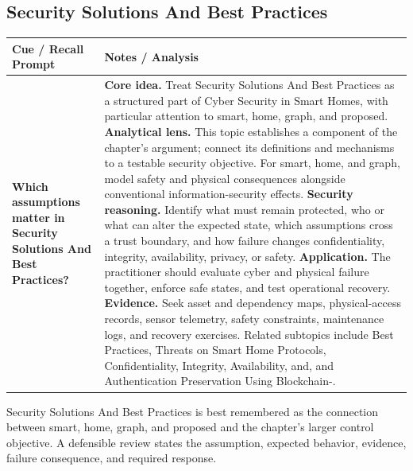\documentclass[11pt]{article}
\newcommand{\CornellHeader}{%
\rowcolor{Navy}\color{white}\bfseries Cue / Recall Prompt & \color{white}\bfseries Notes / Analysis\\\hline}
\newcommand{\CornellRow}[2]{%
\cellcolor{CueGray}\RaggedRight\textbf{#1} & \RaggedRight #2\\\hline}
\begin{document}
\subsection*{Security Solutions And Best Practices}
\begin{longtable}{>{\RaggedRight\arraybackslash}p{}|>{\RaggedRight\arraybackslash}p{}}
\CornellHeader
\CornellRow{Which assumptions matter in Security Solutions And Best Practices?}{\textbf{Core idea.} Treat Security Solutions And Best Practices as a structured part of Cyber Security in Smart Homes, with particular attention to smart, home, graph, and proposed. \textbf{Analytical lens.} This topic establishes a component of the chapter's argument; connect its definitions and mechanisms to a testable security objective. For smart, home, and graph, model safety and physical consequences alongside conventional information-security effects. \textbf{Security reasoning.} Identify what must remain protected, who or what can alter the expected state, which assumptions cross a trust boundary, and how failure changes confidentiality, integrity, availability, privacy, or safety. \textbf{Application.} The practitioner should evaluate cyber and physical failure together, enforce safe states, and test operational recovery. \textbf{Evidence.} Seek asset and dependency maps, physical-access records, sensor telemetry, safety constraints, maintenance logs, and recovery exercises. Related subtopics include Best Practices, Threats on Smart Home Protocols, Confidentiality, Integrity, Availability, and, and Authentication Preservation Using Blockchain-.}
\end{longtable}
\begin{topicsummary}
Security Solutions And Best Practices is best remembered as the connection between smart, home, graph, and proposed and the chapter's larger control objective. A defensible review states the assumption, expected behavior, evidence, failure consequence, and required response.
\end{topicsummary}
\end{document}
